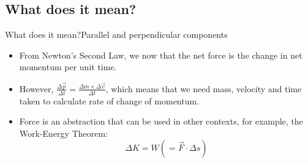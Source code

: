 





\subsection{What does it mean?}
\begin{frame}{What does it mean?}{Parallel and perpendicular components}
\begin{itemize}
    \item From Newton's Second Law, we now that the net force is the change in net momentum per unit time.
    \item However, \(\frac{\Delta \vec{p}}{\Delta t} = \frac{\Delta m \times \Delta \vec{v}}{\Delta t}\), which means that we need mass, velocity and time taken to calculate rate of change of momentum.
    \item Force is an abstraction that can be used in other contexts, for example, the Work-Energy Theorem:
        \[\Delta K = W ( = \vec{F}\cdot \Delta s )\]
\end{itemize}
\end{frame}